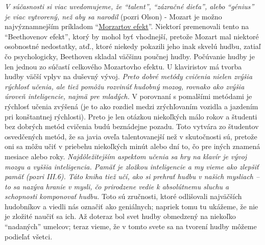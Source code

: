 \emph{V súčasnosti si viac uvedomujeme, že “talent”, “zázračné dieťa”, alebo “génius” je viac vytvorený, než aby sa narodil} (pozri Olson) - Mozart je možno najvýznamnejším príkladom “\href{http://parenting-baby.com/Parenting-Baby-Music-Research/Music-Research.html}{Morzartov efekt}”. Niektorí premenovali tento na “Beethovenov efekt”, ktorý by mohol byť vhodnejší, pretože Mozart mal niektoré osobnostné nedostatky, atď., ktoré niekedy pokazili jeho inak skvelú hudbu, zatiaľ čo psychologicky, Beethoven skladal väčšinu poučnej hudby. Počúvanie hudby je len jednou zo súčastí celkového Mozartovho efektu. U klaviristov má tvorba hudby väčší vplyv na duševný vývoj. \emph{Preto dobré metódy cvičenia nielen zvýšia rýchlosť učenia, ale tiež pomôžu rozvinúť hudobný mozog, rovnako ako zvýšia úroveň inteligencie, najmä pre mladých.} V porovnaní s pomalšími metódami je rýchlosť učenia zvýšená (je to ako rozdiel medzi zrýchľovaním vozidla a jazdením pri konštantnej rýchlosti). Preto je len otázkou niekoľkých málo rokov a študenti bez dobrých metód cvičenia budú beznádejne pozadu. Toto vytvára zo študentov osvedčených metód, že  sa javia oveľa talentovanejší než v skutočnosti sú, pretože oni sa môžu učiť v priebehu niekoľkých minút alebo dní to, čo pre iných znamená mesiace alebo roky. \emph{Najdôležitejším aspektom učenia sa hry na klavír je vývoj mozgu a vyššia inteligencia. Pamäť je zložkou inteligencie a my vieme ako zlepšiť pamäť (pozri III.6). Táto kniha tiež učí, ako si prehrať hudbu v našich mysliach – to sa nazýva hranie v mysli, čo prirodzene vedie k absolútnemu sluchu a schopnosti komponovať hudbu.} Toto sú zručnosti, ktoré odlišovali najväčších hudobníkov a viedli nás označiť ako geniálnych; napriek tomu tu ukážeme, že nie je zložité naučiť sa ich. Až doteraz bol svet hudby obmedzený na niekoľko “nadaných” umelcov; teraz vieme, že v tomto svete sa na tvorení hudby môžeme podieľať všetci.

